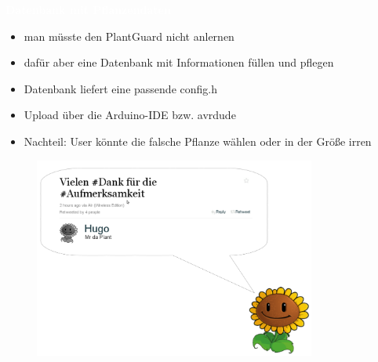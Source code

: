 \documentclass[bigger]{beamer}
\newcommand{\topic}[1]{{\huge{\textcolor{white}{\textbf{#1}}}}}
\begin{document}
\begin{frame}{\topic{Datenbank mit Pflanzendaten}}
	\begin{itemize}
		\item man müsste den PlantGuard nicht anlernen
		\item dafür aber eine Datenbank mit Informationen füllen und pflegen
		\item Datenbank liefert eine passende config.h
		\item Upload über die Arduino-IDE bzw. avrdude
		\item Nachteil: User könnte die falsche Pflanze wählen oder in der Größe irren
	\end{itemize}
\end{frame}

%
\begin{frame}{}
	\begin{figure}[H]
		\includegraphics[width=350px]{Danke.png}
	\end{figure}
\end{frame}
\end{document}
